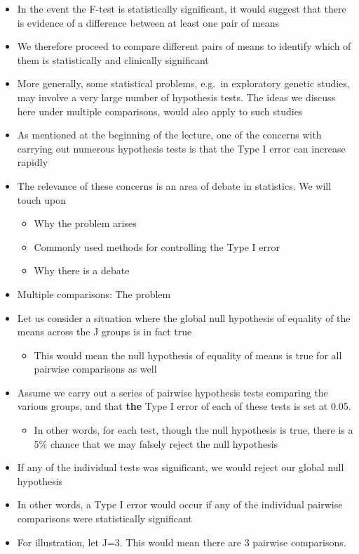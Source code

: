 \documentclass[
]{book}
\providecommand{\tightlist}{%
  \setlength{\itemsep}{0pt}\setlength{\parskip}{0pt}}
\begin{document}
\begin{itemize}
\tightlist
\item
  In the event the F-test is statistically significant, it would suggest that there is evidence of a difference between at least one pair of means
\item
  We therefore proceed to compare different pairs of means to identify which of them is statistically and clinically significant
\item
  More generally, some statistical problems, e.g.~in exploratory genetic studies, may involve a very large number of hypothesis tests. The ideas we discuss here under multiple comparisons, would also apply to such studies
\item
  As mentioned at the beginning of the lecture, one of the concerns with carrying out numerous hypothesis tests is that the Type I error can increase rapidly
\item
  The relevance of these concerns is an area of debate in statistics. We will touch upon

  \begin{itemize}
  \tightlist
  \item
    Why the problem arises
  \item
    Commonly used methods for controlling the Type I error
  \item
    Why there is a debate
  \end{itemize}
\item
  Multiple comparisons: The problem
\item
  Let us consider a situation where the global null hypothesis of equality of the means across the J groups is in fact true

  \begin{itemize}
  \tightlist
  \item
    This would mean the null hypothesis of equality of means is true for all pairwise comparisons as well
  \end{itemize}
\item
  Assume we carry out a series of pairwise hypothesis tests comparing the various groups, and that \textbf{the} Type I error of each of these tests is set at 0.05.

  \begin{itemize}
  \tightlist
  \item
    In other words, for each test, though the null hypothesis is true, there is a 5\% chance that we may falsely reject the null hypothesis
  \end{itemize}
\item
  If any of the individual tests was significant, we would reject our global null hypothesis
\item
  In other words, a Type I error would occur if any of the individual pairwise comparisons were statistically significant
\item
  For illustration, let J=3. This would mean there are 3 pairwise comparisons.


\end{itemize}
\end{document}
